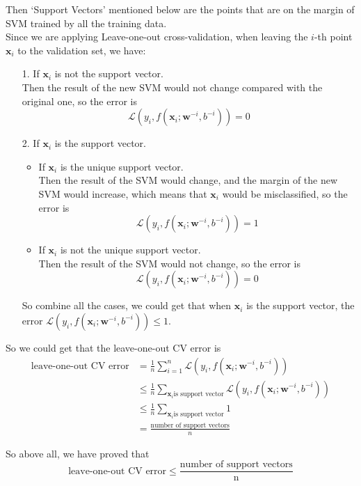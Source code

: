 Then `Support Vectors' mentioned below are the points that are on the margin of SVM trained by all the training data.\\
Since we are applying Leave-one-out cross-validation, when leaving the $i$-th point $\mathbf{x}_i$ to the validation set, we have:
\begin{itemize}
    \item[1.] If $\mathbf{x}_i$ is not the support vector.\\
    Then the result of the new SVM would not change compared with the original one, so the error is $$\mathcal{L}(y_i,f(\mathbf{x}_i;\mathbf{w}^{-i},b^{-i}))=0$$

    \item[2.] If $\mathbf{x}_i$ is the support vector.
    \begin{itemize}
        \item If $\mathbf{x}_i$ is the unique support vector.\\
        Then the result of the SVM would change, and the margin of the new SVM would increase, which means that $\mathbf{x}_i$ would be misclassified, so the error is $$\mathcal{L}(y_i,f(\mathbf{x}_i;\mathbf{w}^{-i},b^{-i}))=1$$
        \item If $\mathbf{x}_i$ is not the unique support vector.\\
        Then the result of the SVM would not change, so the error is $$\mathcal{L}(y_i,f(\mathbf{x}_i;\mathbf{w}^{-i},b^{-i}))=0$$
    \end{itemize}
    So combine all the cases, we could get that when $\mathbf{x}_i$ is the support vector, the error $\mathcal{L}(y_i,f(\mathbf{x}_i;\mathbf{w}^{-i},b^{-i}))\leq 1$.
\end{itemize}
So we could get that the leave-one-out CV error is
\begin{align*}
    \text{leave-one-out CV error} &= \frac{1}{n}\sum_{i=1}^n\mathcal{L}(y_i,f(\mathbf{x}_i;\mathbf{w}^{-i},b^{-i})) \\
    &\leq \frac{1}{n}\sum_{\mathbf{x}_i \text{is support vector}} \mathcal{L}(y_i,f(\mathbf{x}_i;\mathbf{w}^{-i},b^{-i})) \\
    &\leq \frac{1}{n}\sum_{\mathbf{x}_i \text{is support vector}} 1 \\
    &= \frac{\text{number of support vectors}}{n}
\end{align*}

So above all, we have proved that
$$\text{leave-one-out CV error}\leq \frac{\text{number of support vectors}}{\text{n}}$$

\newpage